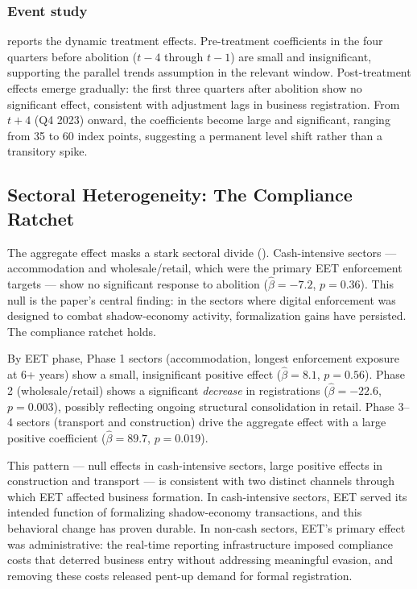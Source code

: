 \documentclass[12pt]{article}
\begin{document}


\subsubsection*{Event study}  reports the dynamic treatment effects. Pre-treatment coefficients in the four quarters before abolition ($t-4$ through $t-1$) are small and insignificant, supporting the parallel trends assumption in the relevant window. Post-treatment effects emerge gradually: the first three quarters after abolition show no significant effect, consistent with adjustment lags in business registration. From $t+4$ (Q4 2023) onward, the coefficients become large and significant, ranging from 35 to 60 index points, suggesting a permanent level shift rather than a transitory spike.



\subsection{Sectoral Heterogeneity: The Compliance Ratchet}

The aggregate effect masks a stark sectoral divide (). Cash-intensive sectors --- accommodation and wholesale/retail, which were the primary EET enforcement targets --- show no significant response to abolition ($\hat{\beta} = -7.2$, $p = 0.36$). This null is the paper's central finding: in the sectors where digital enforcement was designed to combat shadow-economy activity, formalization gains have persisted. The compliance ratchet holds.

By EET phase, Phase 1 sectors (accommodation, longest enforcement exposure at 6+ years) show a small, insignificant positive effect ($\hat{\beta} = 8.1$, $p = 0.56$). Phase 2 (wholesale/retail) shows a significant \textit{decrease} in registrations ($\hat{\beta} = -22.6$, $p = 0.003$), possibly reflecting ongoing structural consolidation in retail. Phase 3--4 sectors (transport and construction) drive the aggregate effect with a large positive coefficient ($\hat{\beta} = 89.7$, $p = 0.019$).

This pattern --- null effects in cash-intensive sectors, large positive effects in construction and transport --- is consistent with two distinct channels through which EET affected business formation. In cash-intensive sectors, EET served its intended function of formalizing shadow-economy transactions, and this behavioral change has proven durable. In non-cash sectors, EET's primary effect was administrative: the real-time reporting infrastructure imposed compliance costs that deterred business entry without addressing meaningful evasion, and removing these costs released pent-up demand for formal registration.
\end{document}
